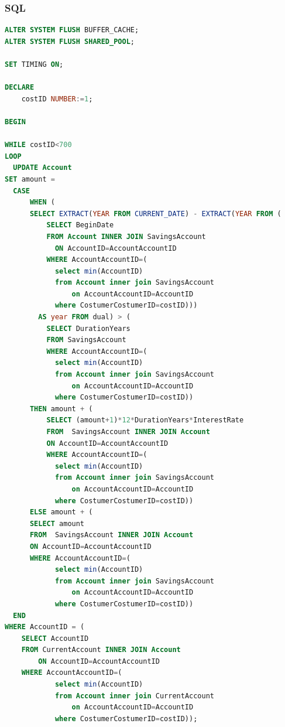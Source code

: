 \documentclass[a4paper, 10pt]{article}
\begin{document}
\subsubsection{SQL}
\begin{lstlisting}[language=SQL]
ALTER SYSTEM FLUSH BUFFER_CACHE;
ALTER SYSTEM FLUSH SHARED_POOL;

SET TIMING ON;

DECLARE 
    costID NUMBER:=1;
    
BEGIN

WHILE costID<700
LOOP
  UPDATE Account 
SET amount =     
  CASE          
      WHEN (
      SELECT EXTRACT(YEAR FROM CURRENT_DATE) - EXTRACT(YEAR FROM (
          SELECT BeginDate 
          FROM Account INNER JOIN SavingsAccount 
            ON AccountID=AccountAccountID 
          WHERE AccountAccountID=(
            select min(AccountID) 
            from Account inner join SavingsAccount 
                on AccountAccountID=AccountID 
            where CostumerCostumerID=costID)))
        AS year FROM dual) > (
          SELECT DurationYears 
          FROM SavingsAccount 
          WHERE AccountAccountID=(
            select min(AccountID) 
            from Account inner join SavingsAccount 
                on AccountAccountID=AccountID 
            where CostumerCostumerID=costID))
      THEN amount + ( 
          SELECT (amount+1)*12*DurationYears*InterestRate 
          FROM  SavingsAccount INNER JOIN Account 
          ON AccountID=AccountAccountID 
          WHERE AccountAccountID=(
            select min(AccountID) 
            from Account inner join SavingsAccount 
                on AccountAccountID=AccountID 
            where CostumerCostumerID=costID))   
      ELSE amount + ( 
      SELECT amount 
      FROM  SavingsAccount INNER JOIN Account 
      ON AccountID=AccountAccountID 
      WHERE AccountAccountID=(
            select min(AccountID) 
            from Account inner join SavingsAccount 
                on AccountAccountID=AccountID 
            where CostumerCostumerID=costID)) 
  END 
WHERE AccountID = (
    SELECT AccountID 
    FROM CurrentAccount INNER JOIN Account 
        ON AccountID=AccountAccountID 
    WHERE AccountAccountID=(
            select min(AccountID) 
            from Account inner join CurrentAccount 
                on AccountAccountID=AccountID 
            where CostumerCostumerID=costID));


\end{lstlisting}
\end{document}
